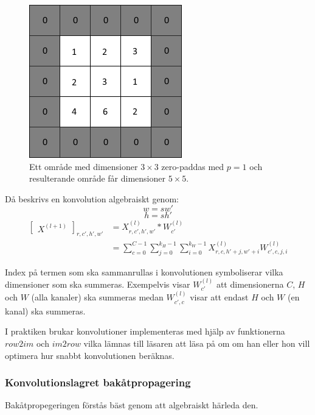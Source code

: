 \documentclass[a4paper,11pt,twoside]{article}
\begin{document}
\begin{figure}[h]\label{figzeropad}
	\centering
  		\includegraphics[scale=0.7]{zeropadding.png}
  	\caption{Ett område med dimensioner $3 \times 3$ zero-paddas med $p=1$ och resulterande område får dimensioner $5 \times 5$.}
\end{figure}

Då beskrivs en konvolution algebraiskt genom: \cite{cs231n} \cite{convmath}
\begin{equation}
w = sw'
\end{equation}
\begin{equation}
h = sh'
\end{equation}
\begin{equation}\label{konvolution}
\begin{split}
	\begin{bmatrix} X^{(l+1)} \end{bmatrix}_{r, c', h', w'}	
		& = X^{(l)}_{r, c', h', w'} *W^{(l)}_{c'} \\
		& = \sum^{C-1}_{c=0} \sum^{k_H-1}_{j=0} \sum^{k_W-1}_{i=0} X^{(l)}_{r, c, h'+j, w'+i}W^{(l)}_{c', c, j, i}
\end{split}
\end{equation}

Index på termen som ska sammanrullas i konvolutionen symboliserar vilka dimensioner som ska summeras. Exempelvis visar $W^{(l)}_{c'}$ att dimensionerna $C$, $H$ och $W$ (alla kanaler) ska summeras medan  $W^{(l)}_{c', c}$ visar att endast $H$ och $W$ (en kanal) ska summeras.

I praktiken brukar konvolutioner implementeras med hjälp av funktionerna $row2im$ och $im2row$ vilka lämnas till läsaren att läsa på om om han eller hon vill optimera hur snabbt konvolutionen beräknas. \cite{cs231n} \cite{convmath} \cite{convarithmetic}

\subsubsection{Konvolutionslagret bakåtpropagering}
Bakåtpropegeringen förstås bäst genom att algebraiskt härleda den. 
\end{document}
